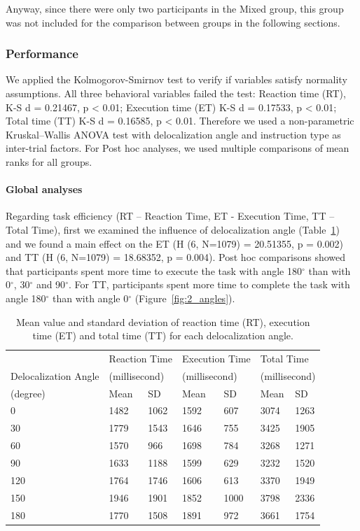 Anyway, since there were only two participants in the Mixed group, this group was not included for the comparison between groups in the following sections.

\subsubsection{Performance}
We applied the Kolmogorov-Smirnov test to verify if variables satisfy normality assumptions. All three behavioral variables failed the test: Reaction time (RT), K-S d = 0.21467, p \textless{} 0.01; Execution time (ET) K-S d = 0.17533, p \textless{} 0.01; Total time (TT) K-S d = 0.16585, p \textless{} 0.01. Therefore we used a non-parametric Kruskal–Wallis ANOVA test with delocalization angle and instruction type as inter-trial factors. For Post hoc analyses, we used multiple comparisons of mean ranks for all groups.

\paragraph{Global analyses}
Regarding task efficiency (RT – Reaction Time, ET - Execution Time, TT – Total Time), first we examined the influence of delocalization angle (Table~\ref{tab:angles}) and we found a main effect on the ET (H (6, N=1079) = 20.51355, p = 0.002) and TT (H (6, N=1079) = 18.68352, p = 0.004). Post hoc comparisons showed that participants spent more time to execute the task with angle 180$^{\circ}$ than with 0$^{\circ}$, 30$^{\circ}$ and 90$^{\circ}$. For TT, participants spent more time to complete the task with angle 180$^{\circ}$ than with angle 0$^{\circ}$ (Figure~\ref{fig:2_angles}).

\begin{table}[!t]
\renewcommand{\arraystretch}{1.3}
\caption{Mean value and standard deviation of reaction time (RT), execution time (ET) and total time (TT) for each delocalization angle.}
\label{tab:angles}
\centering
\begin{tabular}{p{2.5cm} l l l l l l}
	\hline
     & \multicolumn{2}{p{3cm}}{Reaction Time} & \multicolumn{2}{p{3cm}}{Execution Time} & \multicolumn{2}{p{3cm}}{Total Time} \\
     Delocalization Angle & \multicolumn{2}{p{2.5cm}}{(millisecond)} & \multicolumn{2}{p{2.5cm}}{(millisecond)} & \multicolumn{2}{p{2.5cm}}{(millisecond)} \\
    (degree) & Mean & SD & Mean & SD & Mean & SD \\
    \hline
    0 & 1482 & 1062 & 1592 & 607 & 3074 & 1263 \\
   	30 & 1779 & 1543 & 1646 & 755 & 3425 & 1905 \\
	60 & 1570 & 966 & 1698 & 784 & 3268 & 1271 \\
	90 & 1633 & 1188 & 1599 & 629 & 3232 & 1520 \\
	120 & 1764 & 1746 & 1606 & 613 & 3370 & 1949 \\
	150 & 1946 & 1901 & 1852 & 1000 & 3798 & 2336 \\
	180 & 1770 & 1508 & 1891 & 972 & 3661 & 1754 \\ \hline
\end{tabular}
\end{table}

